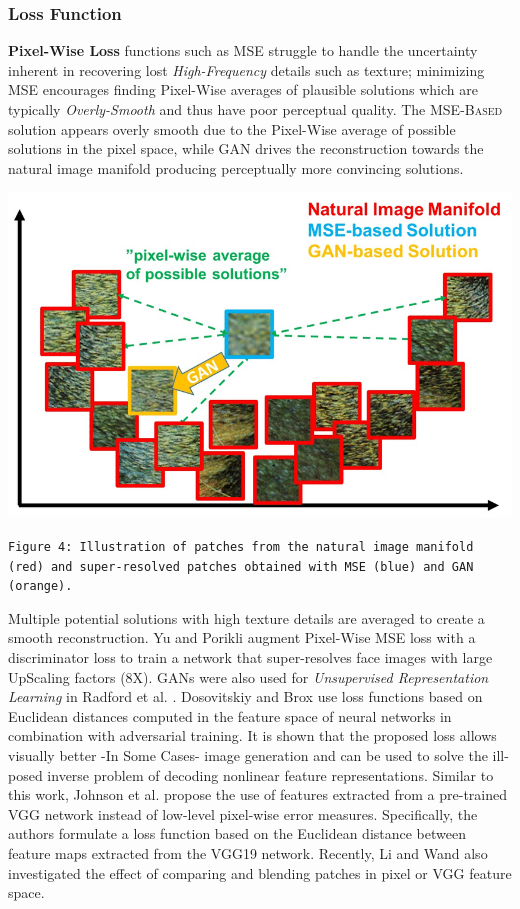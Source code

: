 \documentclass[12pt]{article}
\begin{document}
			\subsubsection{Loss Function}
				\textbf{Pixel-Wise Loss} functions such as MSE struggle to handle the uncertainty inherent in recovering lost \textit{High-Frequency} details such as texture; minimizing MSE encourages finding Pixel-Wise averages of plausible solutions which are typically \textit{Overly-Smooth} and thus have poor perceptual quality. The \textsc{MSE-Based} solution appears overly smooth due to the Pixel-Wise average of possible solutions in the pixel space, while GAN drives the reconstruction towards the natural image manifold producing perceptually more convincing solutions.
				\begin{center}
					\vspace{0.1in}
					\includegraphics[width=6in]{Images/PW.png}
				
					\texttt{Figure 4: Illustration of patches from the natural image manifold (red)  and super-resolved patches obtained with MSE (blue) and GAN (orange).}
					\vspace{0.1in}
				\end{center}
			
				Multiple potential solutions with high texture details are averaged to create a smooth reconstruction. Yu and Porikli \cite{24} augment Pixel-Wise MSE loss with a discriminator loss to train a network that super-resolves face images with large UpScaling factors (8X). GANs were also used for \textit{Unsupervised Representation Learning} in Radford et al. \cite{25}. Dosovitskiy and Brox \cite{26} use loss functions based on Euclidean distances computed in the feature space of neural networks in combination with adversarial training. It is shown that the proposed loss allows visually better -In Some Cases- image generation and can be used to solve the ill-posed inverse problem of decoding nonlinear feature representations. Similar to this work, Johnson et al. \cite{27} propose the use of features extracted from a pre-trained VGG network instead of low-level pixel-wise error measures. Specifically, the authors formulate a loss function based on the Euclidean distance between feature maps extracted from the VGG19 \cite{17} network. Recently, Li and Wand \cite{28} also investigated the effect of comparing and blending patches in pixel or VGG feature space.
\end{document}
